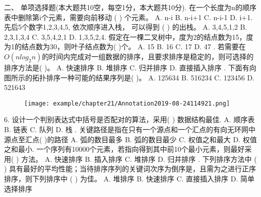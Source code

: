 二、 单项选择题(本大题共10空，每空1分，本大题共10分). 在一个长度为n的顺序表中删除第i个元素，需要向前移动 (  ) 个元素。\newline
A. n-i       B. n-i+1    C. n-i-1   D. i+1. 先后5个数字1,2,3,4,5, 依次顺序进入栈， 可以得到 (  ) 的出栈。\newline
A. 3,4,5,1,2           B. 2,3,1,3,4\newline
C. 3,5,4,2,1           D. 1,3,5,2,4. 假定在一棵二叉树中，度为2的结点数为15，度为1的结点数为30，则叶子结点数为(  )个。\newline
A. 15   B. 16    C. 17  D. 47 . 若需要在$O(nlog_2n)$的时间内完成对一组数据的排序，且要求排序是稳定的，则可选择的排序方法是(  )。\newline
A. 快速排序    B. 堆排序  C. 归并排序  D. 直接插入排序 . 下面有向图所示的拓扑排序一种可能的结果序列是(  )。\newline
A. 125634     B.  516234    C.  123456    D. 521643\newline
\begin{figure}[H]
	\centering  %
	\texttt{[image: example/chapter21/Annotation2019-08-24114921.png]}
\end{figure}
6. 设计一个判别表达式中括号是否配对的算法，采用(  ) 数据结构最佳.\newline
A. 顺序表    B. 链表   C. 队列    D. 栈  . 关键路径是指在只有一个源点和一个汇点的有向无环网中源点至汇点(   )的路径\newline
A. 弧的数目最多   B.  弧的数目最少   C.  权值之和最大    D. 权值之和最小. 一个序列有10000个元素，若指向得到其中前10个最小元素，则最好采用(  ) 方法。\newline
A. 快速排序  B. 插入排序  C. 堆排序  D. 归并排序 . 下列排序方法中 (  ) 具有最好的平均性能；当待排序序列的关键词次序为倒序是，且需为之进行正序排序，则下列排序中 (  ) 为佳。\newline
A. 堆排序  B. 快速排序  C. 直接插入排序  D. 简单选择排序 \newline

